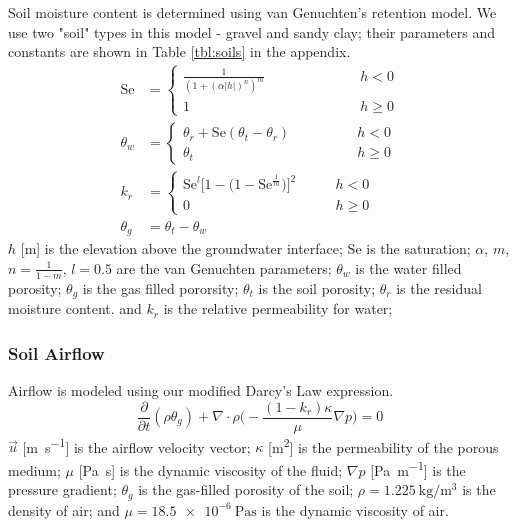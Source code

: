 Soil moisture content is determined using van Genuchten's retention model.
We use two "soil" types in this model - gravel and sandy clay; their parameters and constants are shown in Table \ref{tbl:soils} in the appendix.
\begin{align*}
  \mathrm{Se} &=
    \begin{cases}
      \frac{1}{(1 + (\alpha |h|)^n)^m} & \quad\quad\quad\quad\quad\quad h < 0 \\
    1 & \quad\quad\quad\quad\quad\quad h \geq 0
    \end{cases}\\
  \theta_w &=
    \begin{cases}
      \theta_r + \mathrm{Se}(\theta_t - \theta_r) & \quad\quad\quad\quad h < 0 \\
      \theta_t & \quad\quad\quad\quad h \geq 0
    \end{cases}\\
    k_r &= \begin{cases}
        \mathrm{Se}^l \big[ 1 - \big( 1 - \mathrm{Se}^\frac{1}{m} \big) \big]^2 & \quad\quad h < 0 \\
        0 & \quad\quad h \geq 0
      \end{cases}\\
    \theta_g &= \theta_t - \theta_w
\end{align*}
$h$ [\si{\metre}] is the elevation above the groundwater interface;
$\mathrm{Se}$ is the saturation;
$\alpha$, $m$, $n=\frac{1}{1-m}$, $l=0.5$ are the van Genuchten parameters;
$\theta_w$ is the water filled porosity;
$\theta_g$ is the gas filled pororsity;
$\theta_t$ is the soil porosity;
$\theta_r$ is the residual moisture content.
and $k_r$ is the relative permeability for water;

\subsubsection{Soil Airflow}

Airflow is modeled using our modified Darcy's Law expression.
\begin{equation*}
  \frac{\partial}{\partial t} (\rho \theta_g) + \nabla \cdot \rho \Big( -\frac{(1-k_r) \kappa}{\mu} \nabla p \Big) = 0
\end{equation*}
$\vec{u}$ [\si{\m\per\second}] is the airflow velocity vector;
$\kappa$ [\si{\metre\squared}] is the permeability of the porous medium;
$\mu$ [\si{\pascal\second}] is the dynamic viscosity of the fluid;
$\nabla p$ [\si{\pascal\per\metre}] is the pressure gradient;
$\theta_g$ is the gas-filled porosity of the soil;
$\rho = \SI{1.225}{\kilogram\per\metre\cubed}$ is the density of air;
and $\mu = \SI{18.5e-6}{\pascal\second}$ is the dynamic viscosity of air.\par

